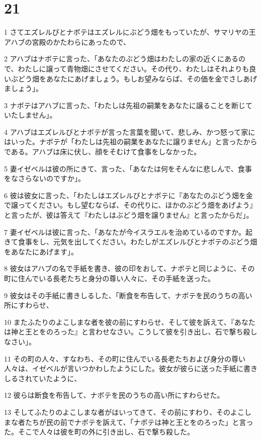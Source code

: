 \chapter{21}

\par 1 さてエズレルびとナボテはエズレルにぶどう畑をもっていたが、サマリヤの王アハブの宮殿のかたわらにあったので、
\par 2 アハブはナボテに言った、「あなたのぶどう畑はわたしの家の近くにあるので、わたしに譲って青物畑にさせてください。その代り、わたしはそれよりも良いぶどう畑をあなたにあげましょう。もしお望みならば、その価を金でさしあげましょう」。
\par 3 ナボテはアハブに言った、「わたしは先祖の嗣業をあなたに譲ることを断じていたしません」。
\par 4 アハブはエズレルびとナボテが言った言葉を聞いて、悲しみ、かつ怒って家にはいった。ナボテが「わたしは先祖の嗣業をあなたに譲りません」と言ったからである。アハブは床に伏し、顔をそむけて食事をしなかった。
\par 5 妻イゼベルは彼の所にきて、言った、「あなたは何をそんなに悲しんで、食事をなさらないのですか」。
\par 6 彼は彼女に言った、「わたしはエズレルびとナボテに『あなたのぶどう畑を金で譲ってください。もし望むならば、その代りに、ほかのぶどう畑をあげよう』と言ったが、彼は答えて『わたしはぶどう畑を譲りません』と言ったからだ」。
\par 7 妻イゼベルは彼に言った、「あなたが今イスラエルを治めているのですか。起きて食事をし、元気を出してください。わたしがエズレルびとナボテのぶどう畑をあなたにあげます」。
\par 8 彼女はアハブの名で手紙を書き、彼の印をおして、ナボテと同じように、その町に住んでいる長老たちと身分の尊い人々に、その手紙を送った。
\par 9 彼女はその手紙に書きしるした、「断食を布告して、ナボテを民のうちの高い所にすわらせ、
\par 10 またふたりのよこしまな者を彼の前にすわらせ、そして彼を訴えて、『あなたは神と王とをのろった』と言わせなさい。こうして彼を引き出し、石で撃ち殺しなさい」。
\par 11 その町の人々、すなわち、その町に住んでいる長老たちおよび身分の尊い人々は、イゼベルが言いつかわしたようにした。彼女が彼らに送った手紙に書きしるされていたように、
\par 12 彼らは断食を布告して、ナボテを民のうちの高い所にすわらせた。
\par 13 そしてふたりのよこしまな者がはいってきて、その前にすわり、そのよこしまな者たちが民の前でナボテを訴えて、「ナボテは神と王とをのろった」と言った。そこで人々は彼を町の外に引き出し、石で撃ち殺した。

